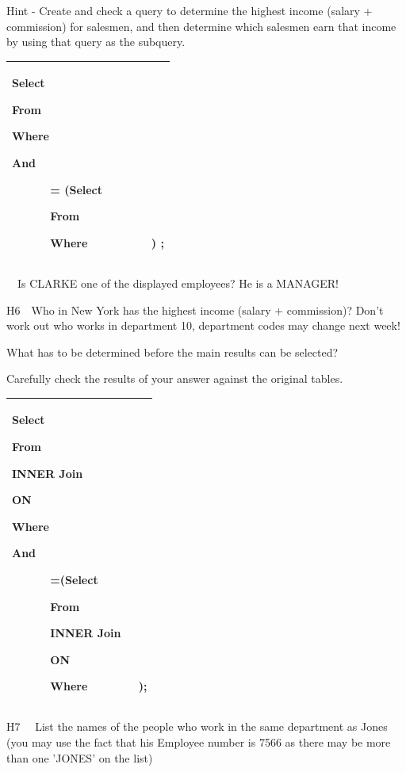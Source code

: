 Hint - Create and check a query to determine the highest income (salary + commission) for salesmen, and then determine which salesmen earn that income by using that query as the subquery.

\begin{flushleft}
\tablefirsthead{}
\tablehead{}
\tabletail{}
\tablelasttail{}
\begin{supertabular}{|m{14.551001cm}|}
\hline
Select

From

Where

And\ \ \ \ \ \ 

\ \ \ \ \ \ = (Select

\ \ \ \ \ \   From

\ \ \ \ \ \   Where\ \ \ \ \ \ \ \ \ \ ) ;

\\\hline
\end{supertabular}
\end{flushleft}
\ \ Is CLARKE one of the displayed employees?  He is a MANAGER!

H6\ \ Who in New York has the highest income (salary + commission)?  Don't work out who works in department 10, department codes may change next week!

What has to be determined before the main results can be selected?

Carefully check the results of your answer against the original tables.

\begin{flushleft}
\tablefirsthead{}
\tablehead{}
\tabletail{}
\tablelasttail{}
\begin{supertabular}{|m{14.551001cm}|}
\hline
Select

From

INNER Join  

ON

Where

And\ \ \ \ \ \ 

\ \ \ \ \ \ =(Select

\ \ \ \ \ \   From

\ \ \ \ \ \   INNER Join  

\ \ \ \ \ \   ON

\ \ \ \  \ \   Where\ \ \ \ \ \ \ \   );\\\hline
\end{supertabular}
\end{flushleft}
H7 \ \ List the names of the people who work in the same department as Jones (you may use the fact that his Employee number is 7566 as there may be more than one 'JONES' on the list)

